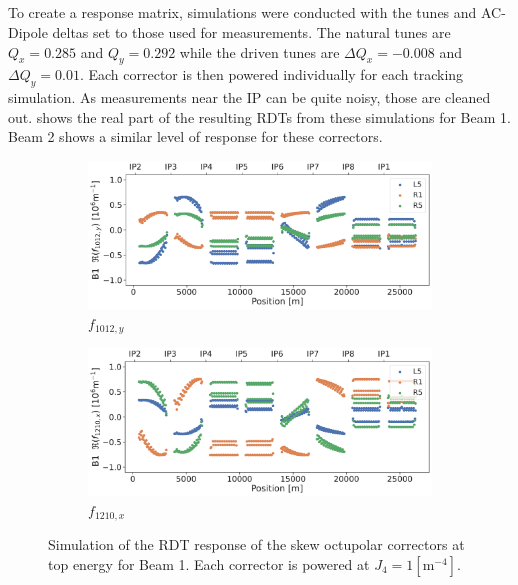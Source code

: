 \subsection{}

To create a response matrix, simulations were conducted with the tunes and AC-Dipole deltas set to
those used for measurements. The natural tunes are $Q_x = 0.285$ and $Q_y = 0.292$ while the driven
tunes are $\Delta Q_x = -0.008$ and $\Delta Q_y = 0.01$. Each corrector is then powered
individually for each tracking simulation. As measurements near the IP can be quite noisy, those are
cleaned out.
 shows the real part of the resulting RDTs from these
simulations for Beam 1. Beam 2 shows a similar level of response for these correctors.

\begin{figure}[!htb]
    \centering
    \begin{subfigure}{0.8\textwidth}
        \includegraphics[width=\textwidth]{./images/f1012_b1_correctors.pdf}
        \caption{$f_{1012,y}$}
    \end{subfigure}
    \par\bigskip 
    \begin{subfigure}{0.8\textwidth}
        \includegraphics[width=\textwidth]{./images/f1210_b1_correctors.pdf}
        \caption{$f_{1210,x}$}
    \end{subfigure}
    \caption{Simulation of the RDT response of the skew octupolar correctors at top energy for Beam
    1. Each corrector is powered at $J_4 = 1 [\text{m}^{-4}]$.}
    \label{fig:skew_octupolar:response_correctors}
\end{figure}

